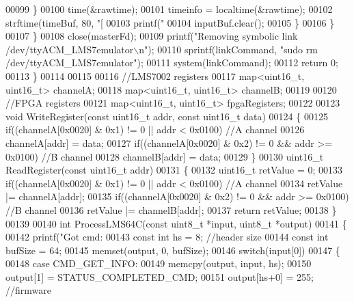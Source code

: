 \begin{DoxyCode}
{{{{{{{00099                 \}
00100                 time(&rawtime);
00101                 timeinfo = localtime(&rawtime);
00102                 strftime(timeBuf, 80, \textcolor{stringliteral}{"[%
00103                 printf(\textcolor{stringliteral}{"%
00104                 inputBuf.clear();
00105             \}
00106         \}
00107     \}
00108     close(masterFd);
00109     printf(\textcolor{stringliteral}{"Removing symbolic link /dev/ttyACM\_LMS7emulator\(\backslash\)n"});
00110     sprintf(linkCommand, \textcolor{stringliteral}{"sudo rm /dev/ttyACM\_LMS7emulator"});
00111     system(linkCommand);
00112     \textcolor{keywordflow}{return} 0;
00113 \}
00114 
00115 
00116 \textcolor{comment}{//LMS7002 registers}
00117 map<uint16\_t, uint16\_t> channelA;
00118 map<uint16\_t, uint16\_t> channelB;
00119 
00120 \textcolor{comment}{//FPGA registers}
00121 map<uint16\_t, uint16\_t> fpgaRegisters;
00122 
00123 \textcolor{keywordtype}{void} WriteRegister(\textcolor{keyword}{const} uint16\_t addr, \textcolor{keyword}{const} uint16\_t data)
00124 \{
00125     \textcolor{keywordflow}{if}((channelA[0x0020] & 0x1) != 0 || addr < 0x0100) \textcolor{comment}{//A channel}
00126         channelA[addr] = data;
00127     \textcolor{keywordflow}{if}((channelA[0x0020] & 0x2) != 0 && addr >= 0x0100) \textcolor{comment}{//B channel}
00128         channelB[addr] = data;
00129 \}
00130 uint16\_t ReadRegister(\textcolor{keyword}{const} uint16\_t addr)
00131 \{
00132     uint16\_t retValue = 0;
00133     \textcolor{keywordflow}{if}((channelA[0x0020] & 0x1) != 0 || addr < 0x0100) \textcolor{comment}{//A channel}
00134         retValue |= channelA[addr];
00135     \textcolor{keywordflow}{if}((channelA[0x0020] & 0x2) != 0 && addr >= 0x0100) \textcolor{comment}{//B channel}
00136         retValue |= channelB[addr];
00137     \textcolor{keywordflow}{return} retValue;
00138 \}
00139 
00140 \textcolor{keywordtype}{int} ProcessLMS64C(\textcolor{keyword}{const} uint8\_t *input, uint8\_t *output)
00141 \{
00142     printf(\textcolor{stringliteral}{"Got cmd: %
00143     \textcolor{keyword}{const} \textcolor{keywordtype}{int} hs = 8; \textcolor{comment}{//header size}
00144     \textcolor{keyword}{const} \textcolor{keywordtype}{int} bufSize = 64;
00145     memset(output, 0, bufSize);
00146     \textcolor{keywordflow}{switch}(input[0])
00147     \{
00148     \textcolor{keywordflow}{case} CMD_GET_INFO:
00149         memcpy(output, input, hs);
00150         output[1] = STATUS_COMPLETED_CMD;
00151         output[hs+0] = 255; \textcolor{comment}{//firmware}
}}}}}}}}}}
\end{DoxyCode}
